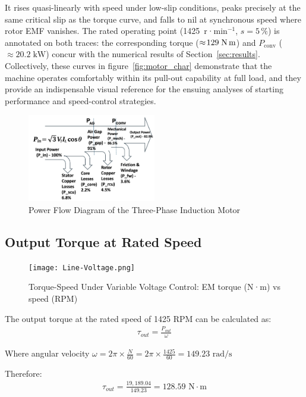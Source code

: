 \documentclass[a4paper,11pt]{IEEEtran}
\begin{document}
It rises quasi-linearly with speed under low-slip conditions, peaks precisely at the same critical slip as the torque curve, and falls to nil at synchronous speed where rotor EMF vanishes. The rated operating point (1425~r·min$^{-1}$, $s\!=\!5\,\%$) is annotated on both traces: the corresponding torque ($\approx\!129\;\text{N\,m}$) and $P_{\text{conv}}$ ($\approx\!20.2\;\text{kW}$) concur with the numerical results of Section~\ref{sec:results}.  Collectively, these curves in figure~\ref{fig:motor_char} demonstrate that the machine operates comfortably within its pull-out capability at full load, and they provide an indispensable visual reference for the ensuing analyses of starting performance and speed-control strategies.

\begin{figure}[h]
    \centering
    \includegraphics[width=0.5\textwidth]{Screenshot 2025-04-24 at 02.31.53.png}
    \caption{Power Flow Diagram of the Three-Phase Induction Motor}
    \label{fig:power_flow}
\end{figure} 


\subsection{Output Torque at Rated Speed}

 \begin{figure}[htbp]
    \centering
    \texttt{[image: Line‑Voltage.png]}
    \caption{Torque-Speed Under Variable Voltage Control: EM torque (N·m) vs speed (RPM)}
    \label{fig:voltage_control}
\end{figure}


The output torque at the rated speed of 1425 RPM can be calculated as:
\begin{align}
    \tau_{out} = \frac{P_{out}}{\omega}
\end{align}

Where angular velocity $\omega = 2\pi \times \frac{N}{60} = 2\pi \times \frac{1425}{60} = 149.23 \text{ rad/s}$

Therefore:
\begin{align}
    \tau_{out} = \frac{19,189.04}{149.23} = 128.59 \text{ N}\cdot\text{m}
\end{align}
\end{document}
